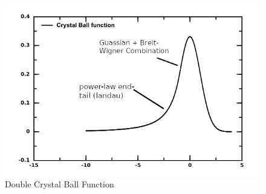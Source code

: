 \begin{figure}
    \centering
    \includegraphics[scale=0.4]{images/CBF.png}
    \caption{Double Crystal Ball Function}
    \label{fig:CBF} 
\end{figure}
